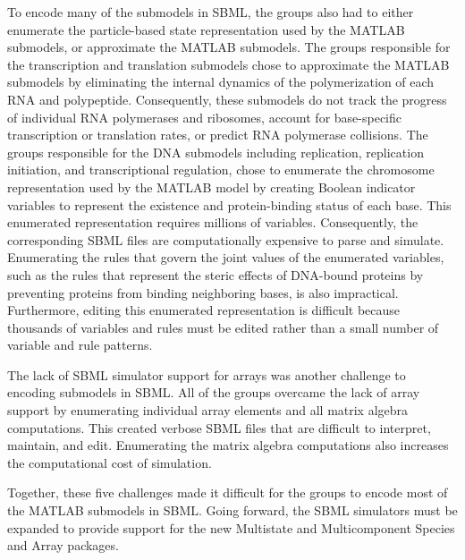 \documentclass[journal,transmag]{IEEEtran}
\begin{document}
To encode many of the submodels in SBML, the groups also had to either enumerate the particle-based state representation used by the MATLAB submodels, or approximate the MATLAB submodels. The groups responsible for the transcription and translation submodels chose to approximate the MATLAB submodels by eliminating the internal dynamics of the polymerization of each RNA and polypeptide. Consequently, these submodels do not track the progress of individual RNA polymerases and ribosomes, account for base-specific transcription or translation rates, or predict RNA polymerase collisions. The groups responsible for the DNA submodels including replication, replication initiation, and transcriptional regulation, chose to enumerate the chromosome representation used by the MATLAB model by creating Boolean indicator variables to represent the existence and protein-binding status of each base. This enumerated representation requires millions of variables. Consequently, the corresponding SBML files are computationally expensive to parse and simulate. Enumerating the rules that govern the joint values of the enumerated variables, such as the rules that represent the steric effects of DNA-bound proteins by preventing proteins from binding neighboring bases, is also impractical. Furthermore, editing this enumerated representation is difficult because thousands of variables and rules must be edited rather than a small number of variable and rule patterns.

The lack of SBML simulator support for arrays was another challenge to encoding submodels in SBML. All of the groups overcame the lack of array support by enumerating individual array elements and all matrix algebra computations. This created verbose SBML files that are difficult to interpret, maintain, and edit. Enumerating the matrix algebra computations also increases the computational cost of simulation.

Together, these five challenges made it difficult for the groups to encode most of the MATLAB submodels in SBML. Going forward, the SBML simulators must be expanded to provide support for the new Multistate and Multicomponent Species and Array packages.
\end{document}
